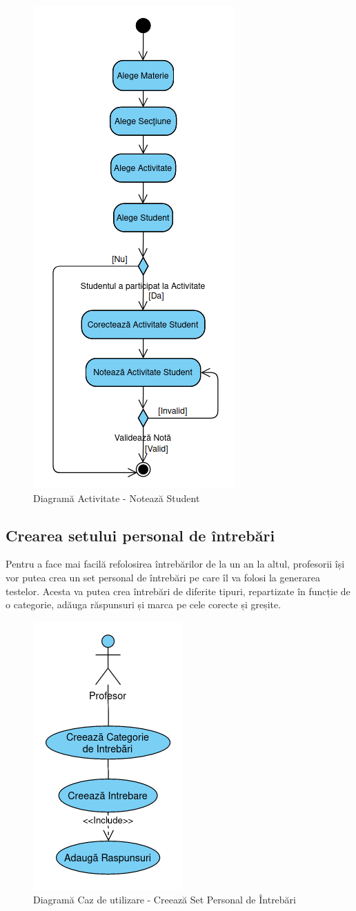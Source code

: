 \documentclass[12pt, a4paper, oneside, romanian]{teza-upb}
\begin{document}
\begin{figure}[H]
\centering
\includegraphics*[width=0.45\columnwidth]{diagrama-activitate-noteaza-student}
\caption{Diagramă Activitate - Notează Student}
\label{diagrama-activitate-noteaza-student}
\end{figure}

\subsection{Crearea setului personal de întrebări}

Pentru a face mai facilă refolosirea întrebărilor de la un an la altul, profesorii își vor putea crea un set personal de întrebări pe care îl va folosi la generarea testelor. Acesta va putea crea întrebări de diferite tipuri, repartizate în funcție de o categorie, adăuga răspunsuri și marca pe cele corecte și greșite.

\begin{figure}[H]
\centering
\includegraphics*[width=0.3\columnwidth]{diagrama-use-case-creeaza-set-personal-de-intrebari}
\caption{Diagramă Caz de utilizare - Creează Set Personal de Întrebări}
\label{diagrama-use-case-creeaza-set-personal-de-intrebari}
\end{figure}
\end{document}
